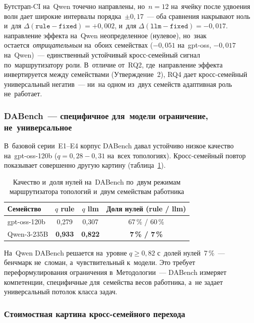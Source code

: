 Бутстрап-CI на~Qwen точечно направлены, но~$n=12$ на~ячейку после
удвоения волн дает широкие интервалы порядка~$\pm0{,}17$~--- оба
сравнения накрывают ноль и~для $\Delta(\mathtt{rule}-\mathtt{fixed})
=+0{,}002$, и~для $\Delta(\mathtt{llm}-\mathtt{fixed})=-0{,}017$. направление эффекта на~Qwen неопределенное (нулевое), но~знак
 остается~\emph{отрицательным} на~обоих семействах
($-0{,}051$ на~gpt-oss, $-0{,}017$ на~Qwen)~--- единственный устойчивый
кросс-семейный сигнал по~маршрутизатору роли. В~отличие от~RQ2,
где~направление эффекта инвертируется между семействами (Утверждение~2), RQ4
дает кросс-семейный универсальный негатив~--- ни~на одном из~двух
семейств адаптивная роль не~работает.

\subsubsection*{DABench~--- специфичное для~модели ограничение, не~универсальное}

В~базовой серии~E1--E4 корпус DABench давал устойчиво низкое качество
на~gpt-oss-120b ($q=0{,}28{-}0{,}31$ на~всех топологиях). Кросс-семейный
повтор показывает совершенно другую картину
(таблица~\ref{tab:exp:dabenchfam}).

\begin{table}[!htbp]
\caption{Качество и~доля нулей на~DABench по~двум режимам маршрутизатора
топологий и~двум семействам работника}
\label{tab:exp:dabenchfam}
\small
\begin{tabularx}{\textwidth}{l c c c}
\toprule
\textbf{Семейство} & \textbf{$q$ rule} & \textbf{$q$ llm} &
\textbf{Доля нулей (rule / llm)} \\
\midrule
gpt-oss-120b   & 0{,}279 & 0{,}307 & 67\,\% / 60\,\% \\
Qwen-3-235B    & \textbf{0{,}933} & \textbf{0{,}822} &
   \textbf{7\,\% / 7\,\%} \\
\bottomrule
\end{tabularx}
\end{table}

На~Qwen DABench решается на~уровне $q\ge0{,}82$ с~долей нулей~7\,\%~---
бенчмарк не~сломан, а~чувствительный к~модели. Это требует переформулирования
ограничения в~Методологии~--- DABench измеряет компетенции,
специфичные для~семейства весов работника, а~не задает универсальный
потолок класса задач.

\subsubsection*{Стоимостная картина кросс-семейного перехода}

